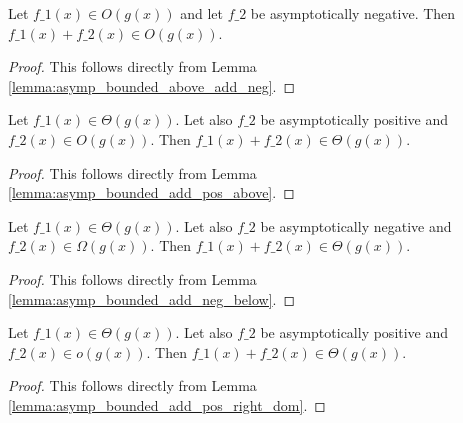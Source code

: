 \begin{lemma}
    \label{lemma:big_o_add_neg}
    \leanok
    Let $f\_1(x) \in O(g(x))$ and let $f\_2$ be asymptotically negative. 
    Then $f\_1(x) + f\_2(x) \in O(g(x))$.
\end{lemma}

\begin{proof}
    \leanok
    This follows directly from Lemma \ref{lemma:asymp_bounded_above_add_neg}.
\end{proof}

\begin{lemma}
    \label{lemma:theta_add_pos_O}
    \leanok
    Let $f\_1(x) \in \Theta(g(x))$. Let also $f\_2$ be asymptotically positive and
    $f\_2(x) \in O(g(x))$. Then $f\_1(x) + f\_2(x) \in \Theta(g(x))$.
\end{lemma}

\begin{proof}
    \leanok
    This follows directly from Lemma \ref{lemma:asymp_bounded_add_pos_above}.
\end{proof}

\begin{lemma}
    \label{lemma:theta_add_neg_Omega}
    \leanok
    Let $f\_1(x) \in \Theta(g(x))$. Let also $f\_2$ be asymptotically negative
    and $f\_2(x) \in \Omega(g(x))$. Then $f\_1(x) + f\_2(x) \in \Theta(g(x))$.
\end{lemma}

\begin{proof}
    \leanok
    This follows directly from Lemma \ref{lemma:asymp_bounded_add_neg_below}.
\end{proof}

\begin{lemma}
    \label{lemma:theta_add_pos_o}
    \leanok
    Let $f\_1(x) \in \Theta(g(x))$. Let also $f\_2$ be asymptotically positive and
    $f\_2(x) \in o(g(x))$. Then $f\_1(x) + f\_2(x) \in \Theta(g(x))$.
\end{lemma}

\begin{proof}
    \leanok
    This follows directly from Lemma \ref{lemma:asymp_bounded_add_pos_right_dom}.
\end{proof}

